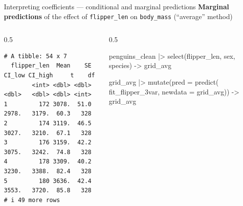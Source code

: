 \documentclass[
  10pt,
  ignorenonframetext,
  aspectratio=169,
  t]{beamer}
\newenvironment{Shaded}{\begin{snugshade}}{\end{snugshade}}
\newcommand{\AttributeTok}[1]{\textcolor[rgb]{0.40,0.45,0.13}{#1}}
\newcommand{\FunctionTok}[1]{\textcolor[rgb]{0.28,0.35,0.67}{#1}}
\newcommand{\NormalTok}[1]{\textcolor[rgb]{0.00,0.23,0.31}{#1}}
\newcommand{\OtherTok}[1]{\textcolor[rgb]{0.00,0.23,0.31}{#1}}
\newcommand{\SpecialCharTok}[1]{\textcolor[rgb]{0.37,0.37,0.37}{#1}}
\newcommand{\StringTok}[1]{\textcolor[rgb]{0.13,0.47,0.30}{#1}}
\newcommand{\bluebold}[1]{\textcolor{bluebeamer}{\textbf{#1}}}
\let\oldtexttt\texttt
\renewcommand{\texttt}[1]{\colorbox{gray!20}{\oldtexttt{#1}}}
\begin{document}
\begin{frame}[fragile]{Interpreting coefficients --- conditional and
marginal predictions}
\protect{}\label{interpreting-coefficients-conditional-and-marginal-predictions-3}
\bluebold{Marginal predictions} of the effect of \texttt{flipper\_len}
on \texttt{body\_mass} (``average'' method)

\begin{columns}[T]
\begin{column}{0.5\linewidth}
\scriptsize

\begin{Shaded}
\end{Shaded}

\begin{verbatim}
# A tibble: 54 x 7
  flipper_len  Mean    SE CI_low CI_high     t    df
        <int> <dbl> <dbl>  <dbl>   <dbl> <dbl> <int>
1         172 3078.  51.0  2978.   3179.  60.3   328
2         174 3119.  46.5  3027.   3210.  67.1   328
3         176 3159.  42.2  3075.   3242.  74.8   328
4         178 3309.  40.2  3230.   3388.  82.4   328
5         180 3636.  42.4  3553.   3720.  85.8   328
# i 49 more rows
\end{verbatim}

\normalsize
\end{column}

\begin{column}{0.5\linewidth}
\scriptsize

\begin{Shaded}
\begin{Highlighting}[]
\NormalTok{penguins\_clean }\SpecialCharTok{|\textgreater{}} 
  \FunctionTok{select}\NormalTok{(flipper\_len, sex, species) }\OtherTok{{-}\textgreater{}}\NormalTok{ grid\_avg}

\NormalTok{grid\_avg }\SpecialCharTok{|\textgreater{}} 
  \FunctionTok{mutate}\NormalTok{(}\AttributeTok{pred =} \FunctionTok{predict}\NormalTok{(}
\NormalTok{    fit\_flipper\_3var,}
    \AttributeTok{newdata =}\NormalTok{ grid\_avg)) }\OtherTok{{-}\textgreater{}}\NormalTok{ grid\_avg}


\end{Highlighting}
\end{Shaded}
\end{column}
\end{columns}
\end{frame}
\end{document}

